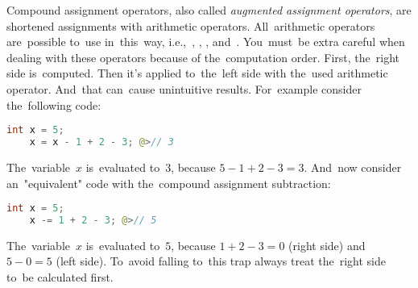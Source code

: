 Compound assignment operators, also called \textit{augmented assignment operators}, are shortened assignments with arithmetic operators.
All~arithmetic operators are~possible to~use in~this~way, \mbox{i.e., \itqs{+=}}, \mbitqs{-=}, \mbitqs{$\star$=}, \mbitqs{/=} \mbox{and \itqs{\%=}}.
You~must~be extra careful when dealing with these operators because of the~computation order.
First, the~right side is~computed.
Then it's applied to~the~left side with the~used arithmetic operator.
And~that can~cause unintuitive results.
For~example consider the~following code:
\begin{lstlisting}[language=Java, frame=no]
    int x = 5;
    x = x - 1 + 2 - 3; @>// 3
\end{lstlisting}

\noindent The~variable~$x$ is~evaluated to~$3$, because $5-1+2-3=3$.
And~now consider an~"equivalent" code with the~compound assignment subtraction:
\begin{lstlisting}[language=Java, frame=no]
    int x = 5;
    x -= 1 + 2 - 3; @>// 5
\end{lstlisting}

\noindent The~variable~$x$ is~evaluated to~$5$, because $1+2-3=0$ (right side) and~$5-0=5$ (left side).
To~avoid falling to~this trap always treat the~right side to~be calculated first.


